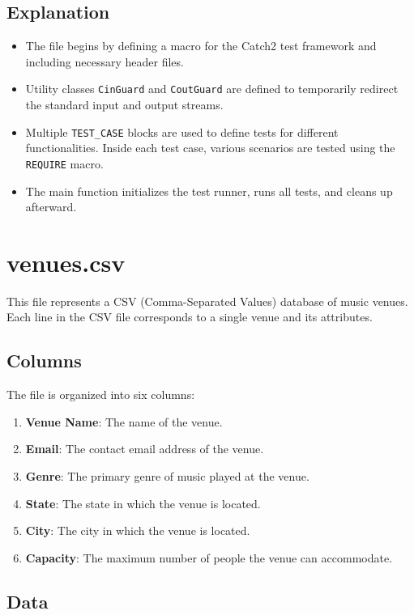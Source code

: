 \documentclass{article}
\begin{document}
	\subsection*{Explanation}
	\begin{itemize}
		\item The file begins by defining a macro for the Catch2 test framework and including necessary header files.
		\item Utility classes \texttt{CinGuard} and \texttt{CoutGuard} are defined to temporarily redirect the standard input and output streams.
		\item Multiple \texttt{TEST\_CASE} blocks are used to define tests for different functionalities. Inside each test case, various scenarios are tested using the \texttt{REQUIRE} macro.
		\item The main function initializes the test runner, runs all tests, and cleans up afterward.
	\end{itemize}
	
	\section{venues.csv}
	
	This file represents a CSV (Comma-Separated Values) database of music venues. Each line in the CSV file corresponds to a single venue and its attributes.
	
	\subsection*{Columns}
	The file is organized into six columns:
	\begin{enumerate}
		\item \textbf{Venue Name}: The name of the venue.
		\item \textbf{Email}: The contact email address of the venue.
		\item \textbf{Genre}: The primary genre of music played at the venue.
		\item \textbf{State}: The state in which the venue is located.
		\item \textbf{City}: The city in which the venue is located.
		\item \textbf{Capacity}: The maximum number of people the venue can accommodate.
	\end{enumerate}
	
	\subsection*{Data}
	
\end{document}
